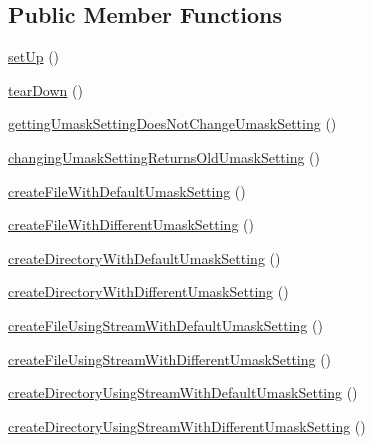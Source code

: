 \subsection*{Public Member Functions}
\begin{DoxyCompactItemize}
\item 
\mbox{\hyperlink{classorg_1_1bovigo_1_1vfs_1_1vfs_stream_umask_test_case_a0bc688732d2b3b162ffebaf7812e78da}{set\+Up}} ()
\item 
\mbox{\hyperlink{classorg_1_1bovigo_1_1vfs_1_1vfs_stream_umask_test_case_a80fe3d17e658907fc75346a0ec9d6fc7}{tear\+Down}} ()
\item 
\mbox{\hyperlink{classorg_1_1bovigo_1_1vfs_1_1vfs_stream_umask_test_case_aafa31d23cc3375251db96195d8923bc1}{getting\+Umask\+Setting\+Does\+Not\+Change\+Umask\+Setting}} ()
\item 
\mbox{\hyperlink{classorg_1_1bovigo_1_1vfs_1_1vfs_stream_umask_test_case_a01cbed801463354d7625953a3f5f3a26}{changing\+Umask\+Setting\+Returns\+Old\+Umask\+Setting}} ()
\item 
\mbox{\hyperlink{classorg_1_1bovigo_1_1vfs_1_1vfs_stream_umask_test_case_a5fa876f59cf1d815954441acb6ec3ade}{create\+File\+With\+Default\+Umask\+Setting}} ()
\item 
\mbox{\hyperlink{classorg_1_1bovigo_1_1vfs_1_1vfs_stream_umask_test_case_a7967423d8e9f27bef2b30a22fafe6434}{create\+File\+With\+Different\+Umask\+Setting}} ()
\item 
\mbox{\hyperlink{classorg_1_1bovigo_1_1vfs_1_1vfs_stream_umask_test_case_a0fc13d215f87be298108828bc66228cd}{create\+Directory\+With\+Default\+Umask\+Setting}} ()
\item 
\mbox{\hyperlink{classorg_1_1bovigo_1_1vfs_1_1vfs_stream_umask_test_case_a28307e2870f934addf064e8b48b72aa7}{create\+Directory\+With\+Different\+Umask\+Setting}} ()
\item 
\mbox{\hyperlink{classorg_1_1bovigo_1_1vfs_1_1vfs_stream_umask_test_case_afa13acaa7f12e43ec99b7a71a960b8fb}{create\+File\+Using\+Stream\+With\+Default\+Umask\+Setting}} ()
\item 
\mbox{\hyperlink{classorg_1_1bovigo_1_1vfs_1_1vfs_stream_umask_test_case_a683740faed424495a9f7cf114551c187}{create\+File\+Using\+Stream\+With\+Different\+Umask\+Setting}} ()
\item 
\mbox{\hyperlink{classorg_1_1bovigo_1_1vfs_1_1vfs_stream_umask_test_case_ad5dcf9ebc35a6786ac0a42eca5dc1460}{create\+Directory\+Using\+Stream\+With\+Default\+Umask\+Setting}} ()
\item 
\mbox{\hyperlink{classorg_1_1bovigo_1_1vfs_1_1vfs_stream_umask_test_case_a5bfb591924b241abdcc3e5d54ff4673b}{create\+Directory\+Using\+Stream\+With\+Different\+Umask\+Setting}} ()

\end{DoxyCompactItemize}
